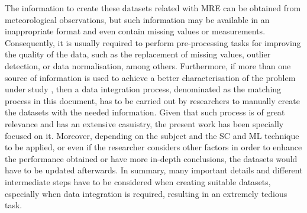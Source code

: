 \documentclass[energies,article,accept,moreauthors,pdftex]{Definitions/mdpi}
\begin{document}
		The information to create these datasets related with MRE can be obtained from meteorological observations, but such information may be available in an inappropriate format and even contain missing values or measurements. Consequently, it is usually required to perform pre-processing tasks for improving the quality of the data, such as the replacement of missing values, outlier detection, or data normalisation, among others. Furthermore, if more than one source of information is used to achieve a better characterisation of the problem under study \cite{JOHANSSON2015143, FERNANDEZ201544, Adams2010}, then a data integration process, denominated as the matching process in this document, has to be carried out by researchers to manually create the datasets with the needed information. Given that such process is of great relevance and has an extensive casuistry, the present work has been specially focused on it. Moreover, depending on the subject and the SC and ML technique to be applied, or even if the researcher considers other factors in order to enhance the performance obtained or have more in-depth conclusions, the datasets would have to be updated afterwards. In summary, many important details and different intermediate steps have to be considered when creating suitable datasets, especially when data integration is required, resulting in an extremely tedious task.
		
\end{document}
